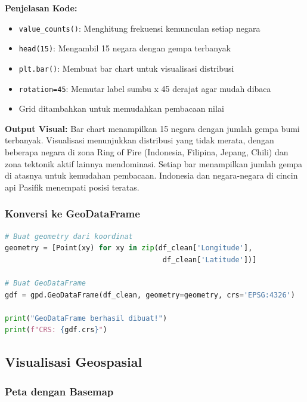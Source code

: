 \documentclass[12pt,a4paper]{article}
\begin{document}
\textbf{Penjelasan Kode:}
\begin{itemize}
    \item \texttt{value\_counts()}: Menghitung frekuensi kemunculan setiap negara
    \item \texttt{head(15)}: Mengambil 15 negara dengan gempa terbanyak
    \item \texttt{plt.bar()}: Membuat bar chart untuk visualisasi distribusi
    \item \texttt{rotation=45}: Memutar label sumbu x 45 derajat agar mudah dibaca
    \item Grid ditambahkan untuk memudahkan pembacaan nilai
\end{itemize}

\textbf{Output Visual:}
Bar chart menampilkan 15 negara dengan jumlah gempa bumi terbanyak. Visualisasi menunjukkan distribusi yang tidak merata, dengan beberapa negara di zona Ring of Fire (Indonesia, Filipina, Jepang, Chili) dan zona tektonik aktif lainnya mendominasi. Setiap bar menampilkan jumlah gempa di atasnya untuk kemudahan pembacaan. Indonesia dan negara-negara di cincin api Pasifik menempati posisi teratas.

\subsubsection{Konversi ke GeoDataFrame}

\begin{lstlisting}[language=Python, caption=Membuat GeoDataFrame]
# Buat geometry dari koordinat
geometry = [Point(xy) for xy in zip(df_clean['Longitude'], 
                                     df_clean['Latitude'])]

# Buat GeoDataFrame
gdf = gpd.GeoDataFrame(df_clean, geometry=geometry, crs='EPSG:4326')

print("GeoDataFrame berhasil dibuat!")
print(f"CRS: {gdf.crs}")
\end{lstlisting}

\subsection{Visualisasi Geospasial}

\subsubsection{Peta dengan Basemap}
\end{document}
